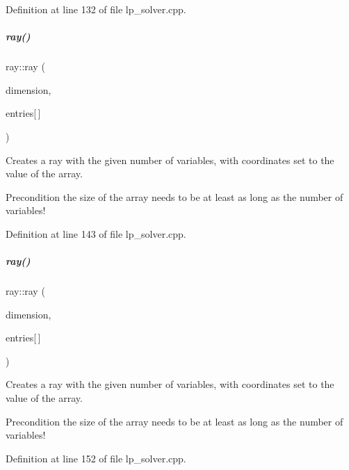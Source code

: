 Definition at line 132 of file lp\+\_\+solver.\+cpp.

\mbox{\label{group___c_l_s_solvers_a121e66bf83dfa1582edc24505bbc8095}} 
\subparagraph{\texorpdfstring{ray()}{ray()}\hspace{0.1cm}{\footnotesize\ttfamily [2/5]}}
{\footnotesize\ttfamily ray\+::ray (\begin{DoxyParamCaption}\item[{N\+V\+A\+R\+\_\+\+T\+Y\+PE}]{dimension,  }\item[{const R\+A\+Y\+E\+N\+T\+\_\+\+T\+Y\+PE}]{entries\mbox{[}$\,$\mbox{]} }\end{DoxyParamCaption})}



Creates a ray with the given number of variables, with coordinates set to the value of the array. 

\begin{DoxyPrecond}{Precondition}
the size of the array needs to be at least as long as the number of variables! 
\end{DoxyPrecond}


Definition at line 143 of file lp\+\_\+solver.\+cpp.

\mbox{\label{group___c_l_s_solvers_a3639433d20b97abc32b56ca93779dcaf}} 
\subparagraph{\texorpdfstring{ray()}{ray()}\hspace{0.1cm}{\footnotesize\ttfamily [3/5]}}
{\footnotesize\ttfamily ray\+::ray (\begin{DoxyParamCaption}\item[{N\+V\+A\+R\+\_\+\+T\+Y\+PE}]{dimension,  }\item[{const E\+X\+P\+\_\+\+T\+Y\+PE}]{entries\mbox{[}$\,$\mbox{]} }\end{DoxyParamCaption})}



Creates a ray with the given number of variables, with coordinates set to the value of the array. 

\begin{DoxyPrecond}{Precondition}
the size of the array needs to be at least as long as the number of variables! 
\end{DoxyPrecond}


Definition at line 152 of file lp\+\_\+solver.\+cpp.

